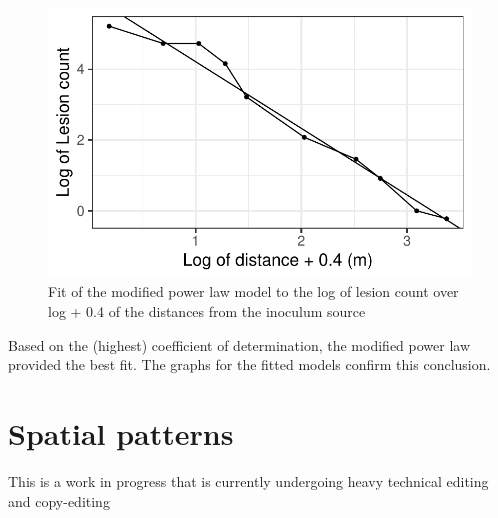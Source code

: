 \documentclass[
  letterpaper,
  DIV=11,
  numbers=noendperiod]{scrreprt}
\begin{document}
\begin{figure}[H]

{\centering \includegraphics{spatial-fitting_files/figure-pdf/fig-fit_grad4-1.pdf}

}

\caption{\label{fig-fit_grad4}Fit of the modified power law model to the
log of lesion count over log + 0.4 of the distances from the inoculum
source}

\end{figure}

Based on the (highest) coefficient of determination, the modified power
law provided the best fit. The graphs for the fitted models confirm this
conclusion.

\hypertarget{spatial-patterns}{%
\chapter{Spatial patterns}\label{spatial-patterns}}

\begin{tcolorbox}[enhanced jigsaw, breakable, left=2mm, opacityback=0, rightrule=.15mm, toprule=.15mm, colframe=quarto-callout-note-color-frame, arc=.35mm, colback=white, bottomrule=.15mm, leftrule=.75mm]
\begin{minipage}[t]{5.5mm}
\textcolor{quarto-callout-note-color}{\faInfo}
\end{minipage}%
\begin{minipage}[t]{\textwidth - 5.5mm}

This is a work in progress that is currently undergoing heavy technical
editing and copy-editing

\end{minipage}%
\end{tcolorbox}
\end{document}
